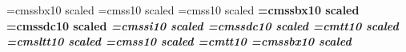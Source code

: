 \font\headbf=cmssbx10 scaled
\font\headrm=cmss10 scaled
\font\rm=cmss10 scaled
\font\bf=cmssbx10 scaled
\font\bff=cmssdc10 scaled
\font\it=cmssi10 scaled
\font\omf=cmssdc10 scaled
\font\text=cmtt10 scaled
\font\textsl=cmsltt10 scaled
\font\super=cmss10 scaled
\font\sample=cmtt10
\font\sectionbf=cmssbx10 scaled

%
\baselineskip=13pt
\parskip=8pt
\parindent=2pc
\raggedbottom
{}

%
\def\bull{\vrule height .9ex width .8ex depth -.1ex }   %
\def\section#1{\noindent{\sectionbf{#1}}}
\def\subsection#1{\indent{\sectionbf{#1}}}
\def\synopsis#1{\setbox0=\hbox{#1\thinspace}
                \hangindent\parindent
                \advance\hangindent by\wd0
                \indent\box0}
\def\segtype{\setbox0=\hbox{$\bullet$\enspace}
             \hangindent\parindent
             \advance\hangindent by\wd0
             \indent\box0}
\def\description{\hangindent\parindent}
\def\option#1{{\it#1}\parskip=0pt\par
                \hangindent2\parindent\indent\indent\parskip=8pt}
\def\note#1#2{\setbox0=\hbox{#1\enspace}
                \hangindent\parindent
                \advance\hangindent by\wd0
                \indent\box0{\bf#2}}
\def\notenote{\setbox0=\hbox{\bull\enspace}
                \hangindent\parindent
                \advance\hangindent by\wd0
                \indent\hbox to\wd0{\hfil}}
\def\operator#1#2#3{\setbox0=\hbox{\bull\enspace}
                        \indent\hbox to\wd0{\hfil}%
                        \hbox to2pc{#1\hfil}\hbox to12pc{#2\hfil}(#3)\par}
\def\expr#1{\setbox0=\hbox{#1\enspace}
                \setbox1=\hbox{\bull\enspace}
                \hangindent\parindent
                \advance\hangindent by\wd0
                \advance\hangindent by\wd1
                \indent\hbox to\wd1{\hfil}\box0}
\def\head#1{\setbox0=\hbox to5pc{\omf #1\hfil}
            \hangindent\parindent
            \advance\hangindent by 5pc
            \indent\box0}
\def\headhead{\hangindent\parindent
                \advance\hangindent by 5pc
                \indent\hbox to5pc{\hfil}}
